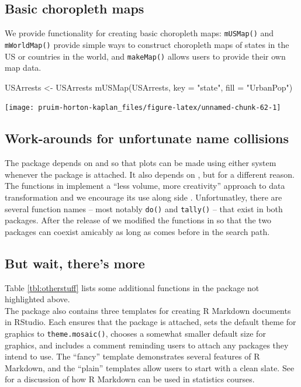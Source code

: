 \subsection{Basic choropleth maps}\label{basic-choropleth-maps}

We provide functionality for creating basic choropleth maps:
\texttt{mUSMap()} and \texttt{mWorldMap()} provide simple ways to
construct choropleth maps of states in the US or countries in the world,
and \texttt{makeMap()} allows users to provide their own map data.

\begin{Schunk}
\begin{Sinput}
USArrests <- USArrests %
mUSMap(USArrests, key = "state", fill = "UrbanPop")
\end{Sinput}


\begin{center}\texttt{[image: pruim-horton-kaplan\_files/figure-latex/unnamed-chunk-62-1]} \end{center}

\end{Schunk}

\subsection{Work-arounds for unfortunate name
collisions}\label{work-arounds-for-unfortunate-name-collisions}

The  package depends on  and  so
that plots can be made using either system whenever the 
package is attached. It also depends on  \citep{dplyr},
but for a different reason. The functions in  implement a
``less volume, more creativity'' approach to data transformation and we
encourage its use along side . Unfortunatley, there are
several function names -- most notably \texttt{do()} and
\texttt{tally()} -- that exist in both packages. After the release of
 we modified the functions in  so that the two
packages can coexist amicably as long as  comes before
 in the search path.

\subsection{But wait, there's more}\label{but-wait-theres-more}

Table \ref{tbl:otherstuff} lists some additional functions in the
 package not highlighted above.\\
The package also contains three templates for creating R Markdown
documents in RStudio. Each ensures that the  package is
attached, sets the default theme for  graphics to
\texttt{theme.mosaic()}, chooses a somewhat smaller default size for
graphics, and includes a comment reminding users to attach any packages
they intend to use. The ``fancy'' template demonstrates several features
of R Markdown, and the ``plain'' templates allow users to start with a
clean slate. See \cite{Baumer:RMarkdown:2014} for a discussion of how R
Markdown can be used in statistics courses.

